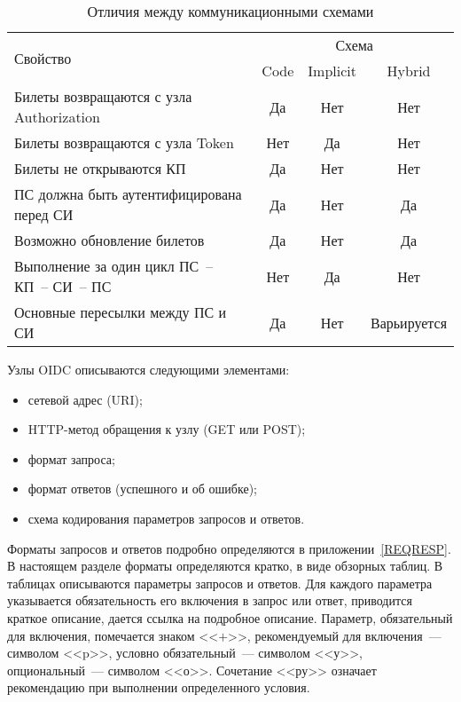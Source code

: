 \begin{table}[H]
\caption{Отличия между коммуникационными схемами}\label{Table.OIDC.Flows}
\begin{tabular}{|l|c|c|c|}
\hline
\multirow{2}{*}{Свойство} & \multicolumn{3}{c|}{Схема}\\
\cline{2-4}
& Code & Implicit & Hybrid\\
\hline
\hline
Билеты возвращаются с узла Authorization & Да & Нет & Нет\\
Билеты возвращаются с узла Token & Нет & Да & Нет\\
Билеты не открываются КП & Да & Нет & Нет\\
ПС должна быть аутентифицирована перед СИ & Да & Нет & Да\\
Возможно обновление билетов & Да & Нет & Да\\
Выполнение за один цикл ПС~-- КП~-- СИ~-- ПС & Нет & Да & Нет\\
Основные пересылки между ПС и СИ & Да & Нет & Варьируется\\
\hline
\end{tabular}
\end{table}

Узлы OIDC описываются следующими элементами:
\begin{itemize}
\item сетевой адрес (URI);
\item HTTP-метод обращения к узлу (GET или POST);
\item формат запроса;
\item формат ответов (успешного и об ошибке);
\item схема кодирования параметров запросов и ответов.
\end{itemize} 

Форматы запросов и ответов подробно определяются в приложении~\ref{REQRESP}.
В настоящем разделе форматы определяются  кратко, в виде обзорных таблиц.
% 
В таблицах описываются параметры запросов и ответов.
Для каждого параметра указывается обязательность его включения в запрос или 
ответ, приводится краткое описание, дается ссылка на подробное описание.
%
Параметр, обязательный для включения, помечается знаком <<$+$>>,
рекомендуемый для включения~--- символом <<p>>,
условно обязательный~--- символом <<у>>,
опциональный~--- символом <<о>>. Сочетание <<ру>> означает рекомендацию 
при выполнении определенного условия.


